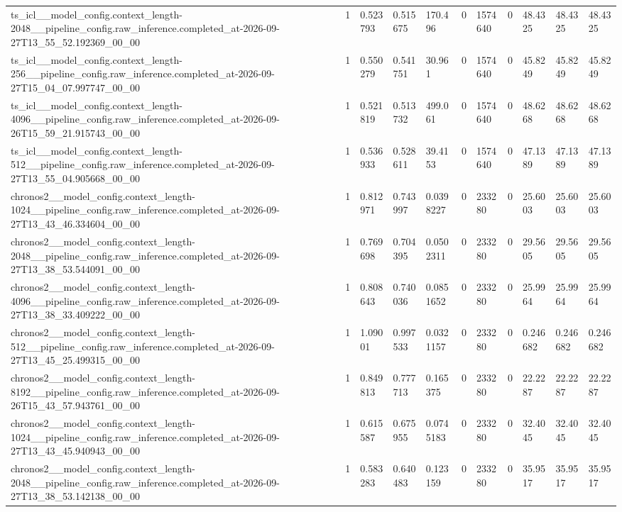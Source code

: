\begin{tabular}{lllllllllll}
ts\_icl\_\_model\_config.context\_length-2048\_\_pipeline\_config.raw\_inference.completed\_at-2026-09-27T13\_55\_52.192369\_00\_00 & 1 & 0.523793 & 0.515675 & 170.496 & 0 & 1574640 & 0 & 48.4325 & 48.4325 & 48.4325 \\
ts\_icl\_\_model\_config.context\_length-256\_\_pipeline\_config.raw\_inference.completed\_at-2026-09-27T15\_04\_07.997747\_00\_00 & 1 & 0.550279 & 0.541751 & 30.961 & 0 & 1574640 & 0 & 45.8249 & 45.8249 & 45.8249 \\
ts\_icl\_\_model\_config.context\_length-4096\_\_pipeline\_config.raw\_inference.completed\_at-2026-09-26T15\_59\_21.915743\_00\_00 & 1 & 0.521819 & 0.513732 & 499.061 & 0 & 1574640 & 0 & 48.6268 & 48.6268 & 48.6268 \\
ts\_icl\_\_model\_config.context\_length-512\_\_pipeline\_config.raw\_inference.completed\_at-2026-09-27T13\_55\_04.905668\_00\_00 & 1 & 0.536933 & 0.528611 & 39.4153 & 0 & 1574640 & 0 & 47.1389 & 47.1389 & 47.1389 \\
chronos2\_\_model\_config.context\_length-1024\_\_pipeline\_config.raw\_inference.completed\_at-2026-09-27T13\_43\_46.334604\_00\_00 & 1 & 0.812971 & 0.743997 & 0.0398227 & 0 & 233280 & 0 & 25.6003 & 25.6003 & 25.6003 \\
chronos2\_\_model\_config.context\_length-2048\_\_pipeline\_config.raw\_inference.completed\_at-2026-09-27T13\_38\_53.544091\_00\_00 & 1 & 0.769698 & 0.704395 & 0.0502311 & 0 & 233280 & 0 & 29.5605 & 29.5605 & 29.5605 \\
chronos2\_\_model\_config.context\_length-4096\_\_pipeline\_config.raw\_inference.completed\_at-2026-09-27T13\_38\_33.409222\_00\_00 & 1 & 0.808643 & 0.740036 & 0.0851652 & 0 & 233280 & 0 & 25.9964 & 25.9964 & 25.9964 \\
chronos2\_\_model\_config.context\_length-512\_\_pipeline\_config.raw\_inference.completed\_at-2026-09-27T13\_45\_25.499315\_00\_00 & 1 & 1.09001 & 0.997533 & 0.0321157 & 0 & 233280 & 0 & 0.246682 & 0.246682 & 0.246682 \\
chronos2\_\_model\_config.context\_length-8192\_\_pipeline\_config.raw\_inference.completed\_at-2026-09-26T15\_43\_57.943761\_00\_00 & 1 & 0.849813 & 0.777713 & 0.165375 & 0 & 233280 & 0 & 22.2287 & 22.2287 & 22.2287 \\
chronos2\_\_model\_config.context\_length-1024\_\_pipeline\_config.raw\_inference.completed\_at-2026-09-27T13\_43\_45.940943\_00\_00 & 1 & 0.615587 & 0.675955 & 0.0745183 & 0 & 233280 & 0 & 32.4045 & 32.4045 & 32.4045 \\
chronos2\_\_model\_config.context\_length-2048\_\_pipeline\_config.raw\_inference.completed\_at-2026-09-27T13\_38\_53.142138\_00\_00 & 1 & 0.583283 & 0.640483 & 0.123159 & 0 & 233280 & 0 & 35.9517 & 35.9517 & 35.9517 \\

\end{tabular}
